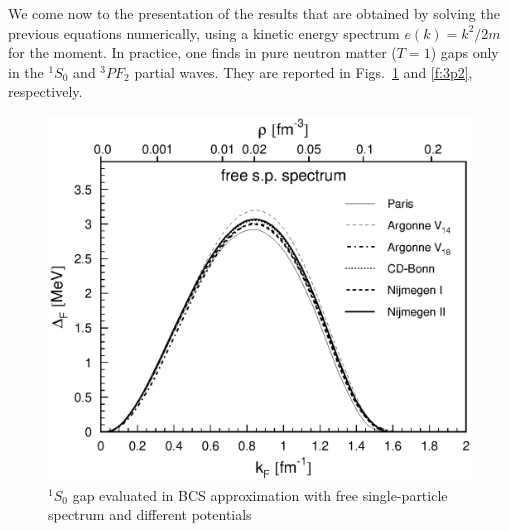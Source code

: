 \documentclass[runningheads]{svmult}
\def\pf{^3\!P\!F_2}
\def\ss{^1\!S_0}
\begin{document}
We come now to the presentation of the results that are obtained by solving
the previous equations numerically,
using a kinetic energy spectrum $e(k)=k^2\!/2m$ for the moment.
In practice, one finds in pure neutron matter ($T=1$) gaps only in the
$\ss$ \cite{TAKA93,CHEN93,AMU85,BCLL90,KHODEL96,ELGA98} 
and $\pf$ \cite{TAKA93,AMU285,BCLL92,ELGA96,BEEHS98,KHODEL98} 
partial waves.
They are reported in Figs.~\ref{f:1s0} and \ref{f:3p2}, respectively.
\begin{figure}[b] %
\includegraphics[height=.41\textheight,bb=40 380 40 720]{nsbk_1s0.ps}
\caption[]
{$\ss$ gap evaluated in BCS approximation with free single-particle spectrum 
 and different potentials}
\label{f:1s0}
\end{figure} %
\end{document}

